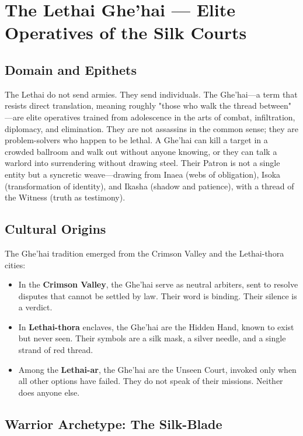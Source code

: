 \section{The Lethai Ghe'hai — Elite Operatives of the Silk Courts}

\subsection{Domain and Epithets}

The Lethai do not send armies. They send individuals. The Ghe'hai—a term that resists direct translation, meaning roughly "those who walk the thread between" —are elite operatives trained from adolescence in the arts of combat, infiltration, diplomacy, and elimination. They are not assassins in the common sense; they are problem-solvers who happen to be lethal. A Ghe'hai can kill a target in a crowded ballroom and walk out without anyone knowing, or they can talk a warlord into surrendering without drawing steel. Their Patron is not a single entity but a syncretic weave—drawing from Inaea (webs of obligation), Isoka (transformation of identity), and Ikasha (shadow and patience), with a thread of the Witness (truth as testimony).

\subsection{Cultural Origins}

The Ghe'hai tradition emerged from the Crimson Valley and the Lethai-thora cities:

\begin{itemize}
\item In the \textbf{Crimson Valley}, the Ghe'hai serve as neutral arbiters, sent to resolve disputes that cannot be settled by law. Their word is binding. Their silence is a verdict.
\item In \textbf{Lethai-thora} enclaves, the Ghe'hai are the Hidden Hand, known to exist but never seen. Their symbols are a silk mask, a silver needle, and a single strand of red thread.
\item Among the \textbf{Lethai-ar}, the Ghe'hai are the Unseen Court, invoked only when all other options have failed. They do not speak of their missions. Neither does anyone else.
\end{itemize}

\subsection{Warrior Archetype: The Silk-Blade}

